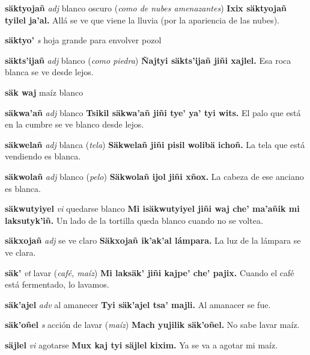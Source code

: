 \documentclass[10pt]{scrbook}
\newcommand{\entry}[1]{\textbf{#1}}
\newcommand{\partofspeech}[1]{\textit{#1}}
\newcommand{\spanishtranslation}[1]{#1}
\newcommand{\clarification}[1]{(\textit{#1})}
\newcommand{\cholexample}[1]{\textbf{#1}}
\newcommand{\exampletranslation}[1]{#1}
\begin{document}
\begin{multicols}{2}
\entry{säktyojañ}
\partofspeech{adj}
\spanishtranslation{blanco oscuro}
\clarification{como de nubes amenazantes}
\cholexample{Ixix säktyojañ tyilel ja'al.}
\exampletranslation{Allá se ve que viene la lluvia (por la apariencia de las nubes).}

\entry{säktyo'}
\partofspeech{s}
\spanishtranslation{hoja grande para envolver pozol}

\entry{säkts'ijañ}
\partofspeech{adj}
\spanishtranslation{blanco}
\clarification{como piedra}
\cholexample{Ñajtyi säkts'ijañ jiñi xajlel.}
\exampletranslation{Esa roca blanca se ve desde lejos.}

\entry{säk waj}
\spanishtranslation{maíz blanco}

\entry{säkwa'añ}
\partofspeech{adj}
\spanishtranslation{blanco}
\cholexample{Tsikil säkwa'añ jiñi tye' ya' tyi wits.}
\exampletranslation{El palo que está en la cumbre se ve blanco desde lejos.}

\entry{säkwelañ}
\partofspeech{adj}
\spanishtranslation{blanca}
\clarification{tela}
\cholexample{Säkwelañ jiñi pisil wolibä ichoñ.}
\exampletranslation{La tela que está vendiendo es blanca.}

\entry{säkwolañ}
\partofspeech{adj}
\spanishtranslation{blanco}
\clarification{pelo}
\cholexample{Säkwolañ ijol jiñi xñox.}
\exampletranslation{La cabeza de ese anciano es blanca.}

\entry{säkwutyiyel}
\partofspeech{vi}
\spanishtranslation{quedarse blanco}
\cholexample{Mi isäkwutyiyel jiñi waj che' ma'añik mi laksutyk'iñ.}
\exampletranslation{Un lado de la tortilla queda blanco cuando no se voltea.}

\entry{säkxojañ}
\partofspeech{adj}
\spanishtranslation{se ve claro}
\cholexample{Säkxojañ ik'ak'al lámpara.}
\exampletranslation{La luz de la lámpara se ve clara.}

\entry{säk'}
\partofspeech{vt}
\spanishtranslation{lavar}
\clarification{café, maíz}
\cholexample{Mi laksäk' jiñi kajpe' che' pajix.}
\exampletranslation{Cuando el café está fermentado, lo lavamos.}

\entry{säk'ajel}
\partofspeech{adv}
\spanishtranslation{al amanecer}
\cholexample{Tyi säk'ajel tsa' majli.}
\exampletranslation{Al amanacer se fue.}

\entry{säk'oñel}
\partofspeech{s}
\spanishtranslation{acción de lavar}
\clarification{maíz}
\cholexample{Mach yujilik säk'oñel.}
\exampletranslation{No sabe lavar maíz.}

\entry{säjlel}
\partofspeech{vi}
\spanishtranslation{agotarse}
\cholexample{Mux kaj tyi säjlel kixim.}
\exampletranslation{Ya se va a agotar mi maíz.}


\end{multicols}
\end{document}
